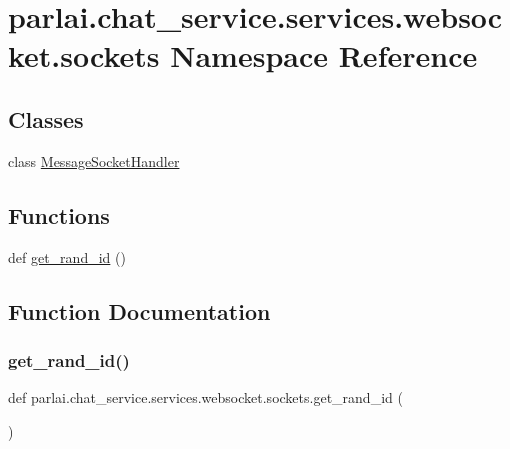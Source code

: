 \hypertarget{namespaceparlai_1_1chat__service_1_1services_1_1websocket_1_1sockets}{}\section{parlai.\+chat\+\_\+service.\+services.\+websocket.\+sockets Namespace Reference}
\label{namespaceparlai_1_1chat__service_1_1services_1_1websocket_1_1sockets}
\subsection*{Classes}
\begin{DoxyCompactItemize}
\item 
class \hyperlink{classparlai_1_1chat__service_1_1services_1_1websocket_1_1sockets_1_1MessageSocketHandler}{Message\+Socket\+Handler}
\end{DoxyCompactItemize}
\subsection*{Functions}
\begin{DoxyCompactItemize}
\item 
def \hyperlink{namespaceparlai_1_1chat__service_1_1services_1_1websocket_1_1sockets_a474be2aef9361e19eacf308fbce1e802}{get\+\_\+rand\+\_\+id} ()
\end{DoxyCompactItemize}


\subsection{Function Documentation}
\mbox{\label{namespaceparlai_1_1chat__service_1_1services_1_1websocket_1_1sockets_a474be2aef9361e19eacf308fbce1e802}} 
\subsubsection{\texorpdfstring{get\+\_\+rand\+\_\+id()}{get\_rand\_id()}}
{\footnotesize\ttfamily def parlai.\+chat\+\_\+service.\+services.\+websocket.\+sockets.\+get\+\_\+rand\+\_\+id (\begin{DoxyParamCaption}{ }\end{DoxyParamCaption})}



